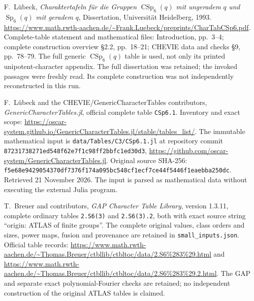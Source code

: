 F.~L\"ubeck,
\emph{Charaktertafeln f\"ur die Gruppen $\operatorname{CSp}_6(q)$
mit ungeradem $q$ und $\operatorname{Sp}_6(q)$ mit geradem $q$},
Dissertation, Universit\"at Heidelberg, 1993.
\url{https://www.math.rwth-aachen.de/~Frank.Luebeck/preprints/CharTabCSp6.pdf}.
Complete-table statement and mathematical files: Introduction,
pp.~3--4; complete construction overview \S2.2, pp.~18--21;
CHEVIE data and checks \S9, pp.~78--79. The full generic
$\operatorname{CSp}_6(q)$ table is used, not only its printed
unipotent-character appendix. The full dissertation was retained;
the invoked passages were freshly read. Its complete construction
was not independently reconstructed in this run.

F.~L\"ubeck and the CHEVIE/GenericCharacterTables contributors,
\emph{GenericCharacterTables.jl}, official complete table
\texttt{CSp6.1}.
Inventory and exact scope:
\url{https://oscar-system.github.io/GenericCharacterTables.jl/stable/tables_list/}.
The immutable mathematical input is
\texttt{data/Tables/C3/CSp6.1.jl} at repository commit
\texttt{87231738271ed548f62e7f1c98ff2bbfc1ed30d3},
\url{https://github.com/oscar-system/GenericCharacterTables.jl}.
Original source SHA-256:
\texttt{f5e68e9429054370df7376f174a095bc548cf1ecf7ce44f5446f1eaebba250dc}.
Retrieved 21 November 2026. The input is parsed as mathematical
data without executing the external Julia program.

T.~Breuer and contributors, \emph{GAP Character Table Library},
version 1.3.11, complete ordinary tables
\texttt{2.S6(3)} and \texttt{2.S6(3).2}, both with exact
source string ``origin: ATLAS of finite groups''.
The complete original values, class orders and sizes, power maps,
fusion and provenance are retained in \texttt{small\_inputs.json}.
Official table records:
\url{https://www.math.rwth-aachen.de/~Thomas.Breuer/ctbllib/ctbltoc/data/2.S6\%283\%29.html}
and
\url{https://www.math.rwth-aachen.de/~Thomas.Breuer/ctbllib/ctbltoc/data/2.S6\%283\%29.2.html}.
The GAP and separate exact polynomial-Fourier checks are retained;
no independent construction of the original ATLAS tables is claimed.

